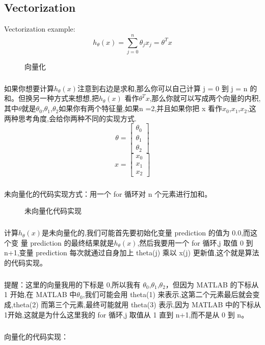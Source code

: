 \documentclass{article}
\begin{document}
\begin{CJK}{UTF8}{gbsn}
\subsection{Vectorization}
Vectorization example:
\begin{equation}
h_\theta(x)=\sum_{j=0}^n{\theta_jx_j}=\theta^Tx
\end{equation}
\begin{figure}[H]
\caption{向量化}
\label{fig:123}
\end{figure}
\subparagraph{}
如果你想要计算$h_\theta(x)$注意到右边是求和,那么你可以自己计算 j = 0 到 j = n 的和。但换另一种方式来想想,把$h_\theta(x)$ 看作$\theta^Tx$,那么你就可以写成两个向量的内积,其中$\theta$就是$\theta_0$,$\theta_1$,$\theta_2$如果你有两个特征量,如果n =2,并且如果你把 x 看作$x_0$,$x_1$,$x_2$,这两种思考角度,会给你两种不同的实现方式.
\begin{equation}
\theta=\left[\begin{matrix}
\theta_0\\\theta_1\\\theta_2
\end{matrix}\right]
\end{equation}
\begin{equation}
x=\left[\begin{matrix}
x_0\\x_1\\x_2
\end{matrix}\right]
\end{equation}
\subparagraph{}
未向量化的代码实现方式：用一个 for 循环对 n 个元素进行加和。
\begin{figure}[H]
\caption{未向量化代码实现}
\label{fig:125}
\end{figure}
\subparagraph{}
计算$h_\theta(x)$是未向量化的,我们可能首先要初始化变量 prediction 的值为 0.0,而这个变
量 prediction 的最终结果就是$h_\theta(x)$,然后我要用一个 for 循环,j 取值 0 到 n+1,变量
prediction 每次就通过自身加上 theta(j) 乘以 x(j) 更新值,这个就是算法的代码实现。
\subparagraph{}
提醒：这里的向量我用的下标是 0,所以我有 $\theta_0$,$\theta_1$,$\theta_2$，但因为 MATLAB
的下标从 1 开始,在 MATLAB 中$\theta_0$,我们可能会用 theta(1) 来表示,这第二个元素最后就会变成,theta(2) 而第三个元素,最终可能就用 theta(3) 表示,因为 MATLAB 中的下标从 1开始,这就是为什么这里我的 for 循环,j 取值从 1 直到 n+1,而不是从 0 到 n。
\subparagraph{}
向量化的代码实现：
\begin{figure}[H]

\end{figure}
\end{CJK}
\end{document}

